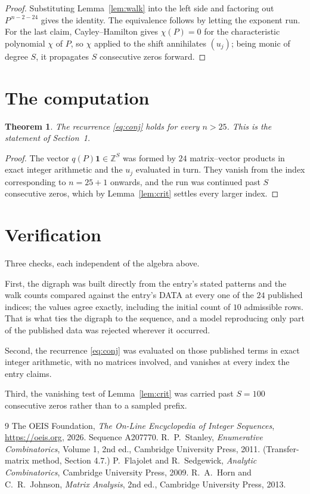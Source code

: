 \documentclass[11pt,a4paper]{article}
\theoremstyle{plain}
\newtheorem{theorem}{Theorem}
\theoremstyle{definition}
\begin{document}
\begin{proof}
Substituting Lemma~\ref{lem:walk} into the left side and factoring out
$P^{\,n-2-24}$ gives the identity. The equivalence follows by letting the exponent
run. For the last claim, Cayley--Hamilton gives $\chi(P)=0$ for the characteristic
polynomial $\chi$ of $P$, so $\chi$ applied to the shift annihilates $(u_j)$; being monic of
degree $S$, it propagates $S$ consecutive zeros forward.
\end{proof}

\section{The computation}

\begin{theorem}
The recurrence \eqref{eq:conj} holds for every $n>25$. This is the statement of
Section~1.
\end{theorem}

\begin{proof}
The vector $q(P)\mathbf{1}\in\mathbb{Z}^{S}$ was formed by $24$ matrix--vector
products in exact integer arithmetic and the $u_j$ evaluated in turn. They vanish from the
index corresponding to $n=25+1$ onwards, and the run was continued past $S$ consecutive
zeros, which by Lemma~\ref{lem:crit} settles every larger index.
\end{proof}

\section{Verification}

Three checks, each independent of the algebra above.

First, the digraph was built directly from the entry's stated patterns and the walk counts
compared against the entry's DATA at every one of the $24$ published indices; the
values agree exactly, including the initial count of $10$ admissible rows. That is
what ties the digraph to the sequence, and a model reproducing only part of the published
data was rejected wherever it occurred.

Second, the recurrence \eqref{eq:conj} was evaluated on those published terms in exact
integer arithmetic, with no matrices involved, and vanishes at every index the entry claims.

Third, the vanishing test of Lemma~\ref{lem:crit} was carried past $S=100$ consecutive
zeros rather than to a sampled prefix.

\begin{thebibliography}{9}
 The OEIS Foundation, \emph{The On-Line Encyclopedia of Integer
Sequences}, \url{https://oeis.org}, 2026. Sequence A207770.
 R.~P.~Stanley, \emph{Enumerative Combinatorics}, Volume 1, 2nd ed.,
Cambridge University Press, 2011. (Transfer-matrix method, Section 4.7.)
 P.~Flajolet and R.~Sedgewick, \emph{Analytic Combinatorics}, Cambridge
University Press, 2009.
 R.~A.~Horn and C.~R.~Johnson, \emph{Matrix Analysis}, 2nd ed., Cambridge
University Press, 2013.
\end{thebibliography}
\end{document}
